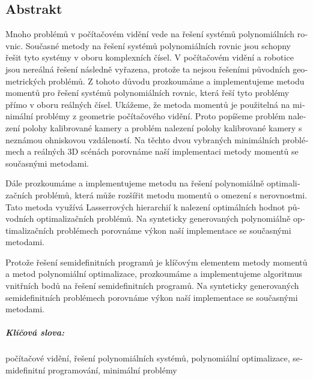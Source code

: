 \begin{otherlanguage}{czech}
\chapter*{Abstrakt}
Mnoho problémů v počítačovém vidění vede na řešení systémů polynomiálních rovnic.
Současné metody na řešení systémů polynomiálních rovnic jsou schopny řešit tyto systémy v oboru komplexních čísel.
V počítačovém vidění a robotice jsou nereálná řešení následně vyřazena, protože ta nejsou řešeními původních geometrických problémů.
Z tohoto důvodu prozkoumáme a implementujeme metodu momentů pro řešení systémů polynomiálních rovnic, která řeší tyto problémy přímo v oboru reálných čísel.
Ukážeme, že metoda momentů je použitelná na minimální problémy z geometrie počítačového vidění.
Proto popíšeme problém nalezení polohy kalibrované kamery a problém nalezení polohy kalibrované kamery s neznámou ohniskovou vzdáleností.
Na těchto dvou vybraných minimálních problémech a reálných 3D scénách porovnáme naší implementaci metody momentů se sou\-čas\-ný\-mi metodami.

Dále prozkoumáme a implementujeme metodu na řešení polynomiálně optimalizačních problémů, která může rozšířit metodu momentů o omezení s nerovnostmi.
Tato metoda využívá Lasserrových hierarchií k nalezení optimálních hodnot původních optimalizačních problémů.
Na synteticky generovaných polynomiálně optimalizačních prob\-lé\-mech porovnáme výkon naší implementace se současnými metodami.

Protože řešení semidefinitních programů je klíčovým elementem metody momentů a metod polynomiální optimalizace, prozkoumáme a implementujeme algoritmus vnitřních bodů na řešení semidefinitních programů.
Na synteticky generovaných semidefinitních problémech porovnáme výkon naší implementace se současnými metodami.

\paragraph{Klíčová slova:}
počítačové vidění, řešení polynomiálních systémů, polynomiální optimalizace, semidefinitní programování, minimální problémy
\end{otherlanguage}
